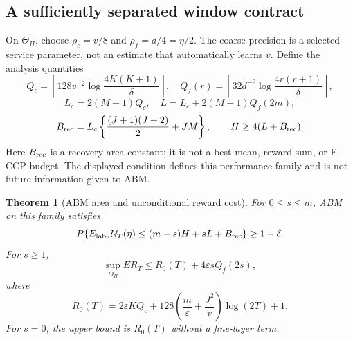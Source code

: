 \documentclass[11pt]{article}
\newtheorem{theorem}{Theorem}[section]
\theoremstyle{remark}
\begin{document}
\subsection{A sufficiently separated window contract}

On $\Theta_H$, choose $\rho_c=v/8$ and $\rho_f=d/4=\eta/2$.
The coarse precision is a selected service parameter, not an estimate
that automatically learns $v$. Define the analysis quantities
\[
 Q_c=\left\lceil128v^{-2}\log\frac{4K(K+1)}\delta\right\rceil,
 \quad Q_f(r)=\left\lceil32d^{-2}
                         \log\frac{4r(r+1)}\delta\right\rceil,
\]
\[
 L_c=2(M+1)Q_c,\quad L=L_c+2(M+1)Q_f(2m),
\]
\[
 B_{\rm rec}=L_c\left\{\frac{(J+1)(J+2)}2+JM\right\},
 \qquad H\ge4(L+B_{\rm rec}).
\]
Here $B_{\rm rec}$ is a recovery-area constant; it is not a best mean,
reward sum, or F-CCP budget. The displayed condition defines this
performance family and is not future information given to ABM.

\begin{theorem}[ABM area and unconditional reward cost]
\label{thm:abm-upper}
For $0\le s\le m$, ABM on this family satisfies
\[
 P\{E_{\rm lab},\mathcal U_T(\eta)
                   \le(m-s)H+sL+B_{\rm rec}\}\ge1-\delta.
\]
For $s\ge1$,
\[
 \sup_{\Theta_H}ER_T\le R_0(T)+4\varepsilon sQ_f(2s),
\]
where
\[
 R_0(T)=2\varepsilon KQ_c+
 128\left(\frac m\varepsilon+\frac{J^2}{v}\right)\log(2T)+1.
\]
For $s=0$, the upper bound is $R_0(T)$ without a fine-layer term.
\end{theorem}
\end{document}
